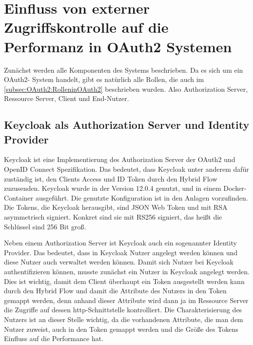 \chapter{Einfluss von externer Zugriffskontrolle auf die Performanz in OAuth2 Systemen}
\label{sec:Einfluss von externer Zugriffskontrolle auf die Performanz in OAuth2 Systemen}

Zunächst werden alle Komponenten des Systems beschrieben. Da es sich um ein OAuth2-
System handelt, gibt es natürlich alle Rollen, die auch im \autoref{subsec:OAuth2:RolleninOAuth2} beschrieben 
wurden. Also Authorization Server, Ressource Server, Client und End-Nutzer. 

\section{Keycloak als Authorization Server und Identity Provider}

Keycloak ist eine Implementierung des Authorization Server der OAuth2 und OpenID 
Connect Spezifikation. Das bedeutet, dass Keycloak unter anderem dafür zuständig ist, den 
Clients Access und ID Token durch den Hybrid Flow zuzusenden. 
Keycloak wurde in der Version 12.0.4 genutzt, und in einem Docker-Container ausgeführt. 
Die genutzte Konfiguration ist in den Anlagen vorzufinden. 
Die Tokens, die Keycloak herausgibt, sind JSON Web Token und mit RSA asymmetrisch 
signiert. Konkret sind sie mit RS256 signiert, das heißt die Schlüssel sind 256 Bit groß.\smallskip

Neben einem Authorization Server ist Keycloak auch ein sogenannter Identity Provider. Das 
bedeutet, dass in Keycloak Nutzer angelegt werden können und diese Nutzer auch 
verwaltet werden können. 
Damit sich Nutzer bei Keycloak authentifizieren können, musste zunächst ein Nutzer in 
Keycloak angelegt werden. Dies ist wichtig, damit dem Client überhaupt ein Token 
ausgestellt werden kann durch den Hybrid Flow und damit die Attribute des Nutzers in den 
Token gemappt werden, denn anhand dieser Attribute wird dann ja im Ressource Server 
die Zugriffe auf dessen http-Schnittstelle kontrolliert. Die Charakterisierung des Nutzers ist 
an dieser Stelle wichtig, da die vorhandenen Attribute, die man dem Nutzer zuweist, auch 
in den Token gemappt werden und die Größe des Tokens Einfluss auf die Performance 
hat.

